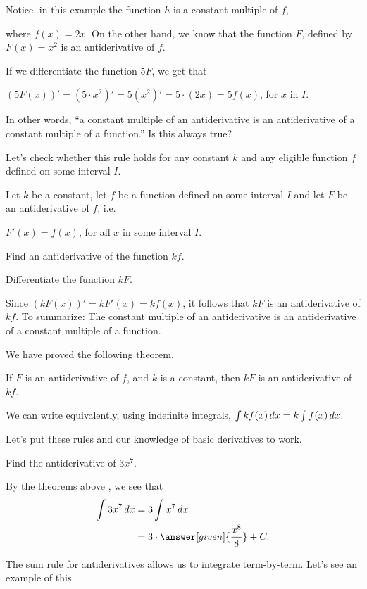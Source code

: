 \documentclass{ximera}
\begin{document}
Notice, in this example the function $h$ is a constant multiple of $f$,

where $f(x)=2x$. On the other hand, we know that the function $F$, defined by
$F(x)=x^2$ is an antiderivative of $f$.

If we  differentiate the function $5F$, we get that

  $\left(5F(x)\right)'=\left(5\cdot x^2 \right)'=5\left(x^2\right)'=5\cdot (2x)=5f(x)$, for $x$ in $I$.

  In other words, ``a constant multiple of an antiderivative is an antiderivative of a constant multiple of a function.''
Is this always true?

Let's check whether this rule holds for  any constant $k$ and any eligible  function $f$ defined on some interval $I$.
 \begin{question}
Let $k$ be a constant, let $f$ be a function defined on some interval $I$ and let $F$ be an antiderivative of $f$, i.e.

$F'(x)=f(x)$, for all  $x$ in some interval $I$.

  Find an antiderivative of the function $k f$.
    \begin{hint}
    Differentiate the function $kF$.
     \end{hint}
     Since $\left(kF(x)\right)'=kF'(x)=kf(x)$, it follows that $kF$ is
     an antiderivative of $kf$.
 To summarize: The constant multiple of an antiderivative is an antiderivative of a constant multiple of a function.
\end{question}
We have proved the following theorem.
\begin{theorem}\label{theorem:CMRA}
If $F$ is an antiderivative of $f$, and $k$ is a constant, then $kF$
is an antiderivative of $kf$.

We can write equivalently, using indefinite integrals,
$\int kf(x) \mathop{}\!d x= k\int f(x)\mathop{}\!d x$.
\end{theorem}
Let's put these rules and our knowledge of basic derivatives to work.
\begin{example}
Find the antiderivative of $3 x^7$.
\begin{explanation}
By the theorems above , we see that
\begin{align*}
\int 3 x^7 \d x &= 3 \int x^7 \d x\\
&= 3 \cdot \answer[given]{\frac{x^8}{8}}+C.
\end{align*}
\end{explanation}
\end{example}
The sum rule for antiderivatives allows us to integrate
term-by-term. Let's see an example of this.
\end{document}
